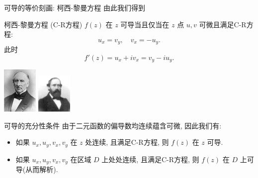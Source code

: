 \begin{frame}{可导的等价刻画: 柯西-黎曼方程}
\onslide<+->由此我们得到
\onslide<+->
\begin{alertblock}{柯西-黎曼方程 (C-R方程)}
$f(z)$ 在 $z$ 可导当且仅当在 $z$ 点 $u,v$ 可微且满足C-R方程:
\[u_x=v_y,\quad v_x=-u_y.\]
此时
\[f'(z)=u_x+iv_x=v_y-iu_y.\]
\end{alertblock}
\onslide<+->
\begin{center}
\includegraphics[width=1.7cm]{misc/Cauchy.jpeg}
\hspace{2cm}\includegraphics[width=1.7cm]{misc/Riemann.jpeg}
\end{center}
\end{frame}


\begin{frame}{可导的充分性条件}
\onslide<+->由于二元函数的偏导数均连续蕴含可微, 因此我们有:
\onslide<+->
\begin{theorem}
\begin{itemize}
	\item 如果 $u_x,u_y,v_x,v_y$ 在 $z$ 处连续, 且满足C-R方程, 则 $f(z)$ 在 $z$ 可导.
	\item 如果 $u_x,u_y,v_x,v_y$ 在区域 $D$ 上处处连续, 且满足C-R方程, 则 $f(z)$ 在 $D$ 上可导(从而解析).
\end{itemize}
\end{theorem}
\end{frame}







